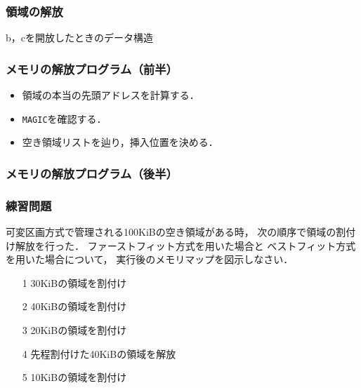 \documentclass[handout]{beamer}                   %
\begin{document}
\begin{frame}
  \frametitle{領域の解放}
  b，cを開放したときのデータ構造\\\vfill
  \begin{minipage}{0.49\columnwidth}
  \end{minipage}
  \begin{minipage}{0.49\columnwidth}
  \end{minipage}
\end{frame}

\begin{frame}
  \frametitle{メモリの解放プログラム（前半）}
  \begin{itemize}
  \item 領域の本当の先頭アドレスを計算する．
  \item {\tt MAGIC}を確認する．
  \item 空き領域リストを辿り，挿入位置を決める．
  \end{itemize}
\end{frame}

\begin{frame}
  \frametitle{メモリの解放プログラム（後半）}
\end{frame}

\begin{frame}
  \frametitle{練習問題}
  可変区画方式で管理される100KiBの空き領域がある時，
  次の順序で領域の割付け解放を行った．
  ファーストフィット方式を用いた場合と
  ベストフィット方式を用いた場合について，
  実行後のメモリマップを図示しなさい．

  \begin{enumerate}
  \item[1] 30KiBの領域を割付け
  \item[2] 40KiBの領域を割付け
  \item[3] 20KiBの領域を割付け
  \item[4] 先程割付けた40KiBの領域を解放
  \item[5] 10KiBの領域を割付け
  \end{enumerate}
\end{frame}
\end{document}

